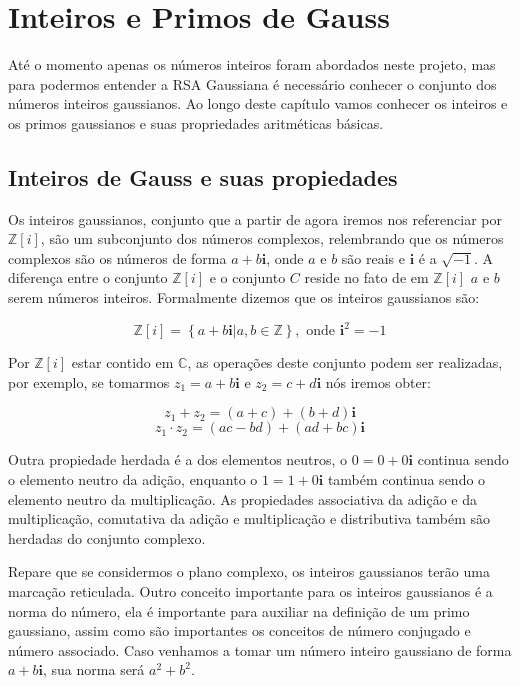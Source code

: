 \pagestyle{fancy}
\fancyhead[R]{\thepage}
\fancyfoot[C]{}



\chapter {Inteiros e Primos de Gauss}
\label{IG}
At\'e o momento apenas os n\'umeros inteiros foram abordados neste projeto, mas para podermos entender a RSA Gaussiana \'e necess\'ario conhecer o conjunto dos n\'umeros inteiros gaussianos. Ao longo deste cap\'itulo vamos conhecer os inteiros e os primos gaussianos e suas propriedades aritm\'eticas b\'asicas. 

\section{Inteiros de Gauss e suas propiedades}

Os inteiros gaussianos, conjunto que a partir de agora iremos nos referenciar por $\mathbb{Z}[i]$, s\~ao um subconjunto dos n\'umeros complexos, relembrando que os n\'umeros complexos s\~ao os n\'umeros de forma $a+b\textbf{i}$, onde $a$ e $b$ s\~ao reais e $\textbf{i}$ \'e a $\sqrt{-1}$. A diferen\c{c}a entre o conjunto $\mathbb{Z}[i]$ e o conjunto $C$ reside no fato de em $\mathbb{Z}[i]$ $a$ e $b$ serem n\'umeros inteiros. Formalmente dizemos que os inteiros gaussianos s\~ao:

$$\mathbb{Z}[i]= \left\{a+b\textbf{i} | a,b \in \mathbb{Z}  \right\}, \textrm{ onde } \textbf{i}^2 = -1$$

Por $\mathbb{Z}[i]$ estar contido em $\mathbb{C}$, as opera\c{c}\~oes deste conjunto podem ser realizadas, por exemplo, se tomarmos $z_1= a + b\textbf{i}$ e $z_2= c + d\textbf{i}$ n\'os iremos obter:

$$z_1   +   z_2 = (a + c) + (b + d)\textbf{i}$$
$$z_1 \cdot z_2 = (ac - bd) + (ad + bc)\textbf{i}$$

Outra propiedade herdada \'e a dos elementos neutros, o $0 = 0 + 0\textbf{i}$ continua sendo o elemento neutro da adi\c{c}\~ao, enquanto o $1 = 1 + 0\textbf{i}$ tamb\'em continua sendo o elemento neutro da multiplica\c{c}\~ao. As propiedades associativa da adi\c{c}\~ao e da multiplica\c{c}\~ao, comutativa da adi\c{c}\~ao e multiplica\c{c}\~ao e distributiva tamb\'em s\~ao herdadas do conjunto complexo.

Repare que se considermos o plano complexo, os inteiros gaussianos ter\~ao uma marca\c{c}\~ao reticulada. Outro conceito importante para os inteiros gaussianos \'e a norma do n\'umero, ela \'e importante para auxiliar na defini\c{c}\~ao de um primo gaussiano, assim como s\~ao importantes os conceitos de n\'umero conjugado e n\'umero associado. Caso venhamos a tomar um n\'umero inteiro gaussiano de forma $a+b\textbf{i}$, sua norma ser\'a $a^2 +b^2$.

